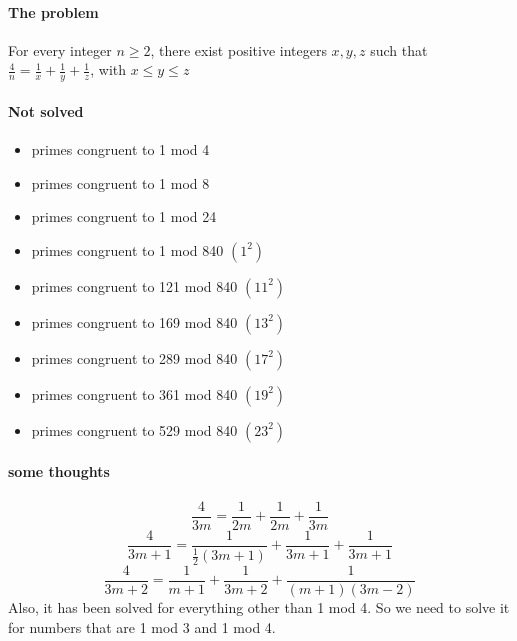 \documentclass[10pt,letter]{article}
\begin{document}
\paragraph{The problem}
For every integer $n\geq2$, there exist positive integers $x,y,z$ such that $\frac{4}{n}=\frac{1}{x}+\frac{1}{y}+\frac{1}{z}$, with $x\leq y\leq z$ 

\paragraph{Not solved} 
\begin{itemize}
    \item primes congruent to 1 mod 4
    \item primes congruent to 1 mod 8
    \item primes congruent to 1 mod 24
    \item primes congruent to 1 mod 840 $(1^2)$ 
    \item primes congruent to 121 mod 840 $(11^2)$
    \item primes congruent to 169 mod 840 $(13^2)$
    \item primes congruent to 289 mod 840 $(17^2)$
    \item primes congruent to 361 mod 840 $(19^2)$
    \item primes congruent to 529 mod 840 $(23^2)$
\end{itemize}

\paragraph{some thoughts}
$$\frac{4}{3m}=\frac{1}{2m}+\frac{1}{2m}+\frac{1}{3m}$$
$$\frac{4}{3m+1}=\frac{1}{\frac{1}{2}(3m+1)}+\frac{1}{3m+1}+\frac{1}{3m+1}$$
$$\frac{4}{3m+2}=\frac{1}{m+1}+\frac{1}{3m+2}+\frac{1}{(m+1)(3m-2)}$$
Also, it has been solved for everything other than 1 mod 4. So we need to solve it for numbers that are 1 mod 3 and 1 mod 4. 
\end{document}
